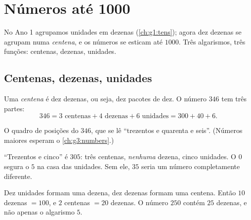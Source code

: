 \chapter{Números até 1000}\label{ch:g2:numbers}

No Ano 1 agrupamos unidades em dezenas (\cref{ch:g1:tens}); agora dez
dezenas se agrupam numa \emph{centena}, e os números se esticam até
$1000$. Três algarismos, três funções: centenas, dezenas, unidades.

\section{Centenas, dezenas, unidades}

\begin{definition}\label{def:g2:numbers:places}
Uma \emph{centena} é dez dezenas, ou seja, dez pacotes de dez. O
número $346$ tem três partes:
\[
346 = 3 \text{ centenas} + 4 \text{ dezenas} + 6 \text{ unidades}
= 300 + 40 + 6 .
\]
\end{definition}

\begin{omfigure}

{\small O quadro de posições do $346$, que se lê ``trezentos e
quarenta e seis''. (Números maiores esperam o
\cref{ch:g3:numbers}.)}
\end{omfigure}

\begin{example}\label{ex:g2:numbers:zero}
``Trezentos e cinco'' é $305$: três centenas, \emph{nenhuma} dezena,
cinco unidades. O $0$ segura o $5$ na casa das unidades. Sem ele,
$35$ seria um número completamente diferente.
\end{example}

\begin{example}[Trocar]\label{ex:g2:numbers:exchange}
Dez unidades formam uma dezena, dez dezenas formam uma centena.
Então $10$ dezenas $= 100$, e $2$ centenas $= 20$ dezenas. O número
$250$ contém $25$ dezenas, e não apenas o algarismo $5$.
\end{example}

